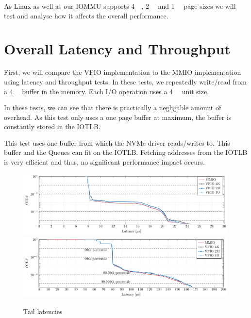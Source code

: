 As Linux as well as our IOMMU supports \qty{4}{\kibi\byte}, \qty{2}{\mebi\byte} and \qty{1}{\gibi\byte} page sizes we will test and analyse how it affects the overall performance.

\section{Overall Latency and Throughput}
First, we will compare the VFIO implementation to the MMIO implementation using latency and throughput tests. In these tests, we repeatedly write/read from a \qty{4}{\kibi\byte} buffer in the memory. Each I/O operation uses a \qty{4}{\kibi\byte} unit size.

In these tests, we can see that there is practically a negligable amount of overhead. As this test only uses a one page buffer at maximum, the buffer is constantly stored in the IOTLB.

This test uses one buffer from which the NVMe driver reads/writes to. This buffer and the Queues can fit on the IOTLB. Fetching addresses from the IOTLB is very efficient and thus, no significant performance impact occurs.

\begin{figure}
    \centering
     {\includegraphics[width=0.99\textwidth]{figures/latency_ccdf_write} \label{fig:ccdf-write}}
     {\includegraphics[width=0.99\textwidth]{figures/latency_ccdf_read} \label{fig:ccdf-read}}
    \caption{Tail latencies}
    \label{fig:ccdf}
\end{figure}

